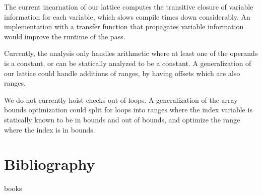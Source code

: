 \documentclass[11pt]{article}
\begin{document}
The current incarnation of our lattice computes the transitive closure of
variable information for each variable, which slows compile times down considerably.
An implementation with a transfer function that propagates variable information would
improve the runtime of the pass.

Currently, the analysis only handles arithmetic where at least one of the operands is
a constant, or can be statically analyzed to be a constant. A generalization of our
lattice could handle additions of ranges, by having offsets which are also ranges.

We do not currently hoist checks out of loops. A generalization of the array bounds optimization
could split for loops into ranges where the index variable is statically known to be in bounds and
out of bounds, and optimize the range where the index is in bounds.

\section{Bibliography}

books
\end{document}
